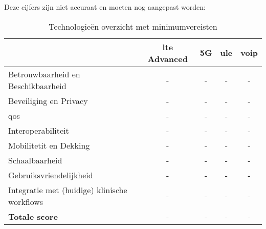 Deze cijfers zijn niet accuraat en moeten nog aangepast worden:

\begin{table}[h!]
    \begin{center}
    \caption{Technologieën overzicht met minimumvereisten}
    \label{tab:Vergelijken van technologieën}
    \begin{tabular}{|l|c|c|c|c|}
    & \textbf{\gls{lte} Advanced} & \textbf{5G} & \textbf{\gls{ule}} & \textbf{\gls{voip}}\\
    \hline
    Betrouwbaarheid en Beschikbaarheid & - & - & - & -\\
    Beveiliging en Privacy & - & - & - & - \\
    \acrfull{qos} & - & - & - & -\\
    Interoperabiliteit & - & - & - & -\\
    Mobilitetit en Dekking & - & - & - & -\\
    Schaalbaarheid & - & - & - & -\\
    Gebruiksvriendelijkheid & - & - & - & -\\
    Integratie met (huidige) klinische workflows  & - & - & - & -\\
    \hline
    \textbf{Totale score}  & - & - & - & -\\
    \end{tabular}
    \end{center}
    \end{table}
